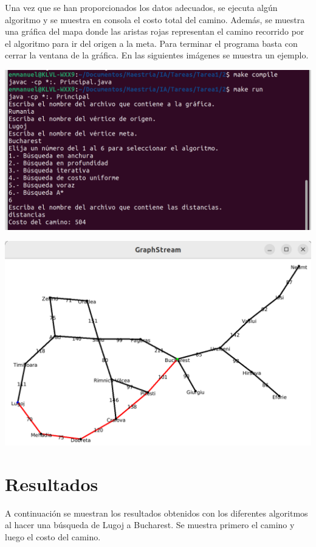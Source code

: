\documentclass{article}
\begin{document}
Una vez que se han proporcionados los datos adecuados, se ejecuta algún algoritmo y se muestra en consola el costo total del camino. Además, se muestra una gráfica del mapa donde las aristas rojas representan el camino recorrido por el algoritmo para ir del origen a la meta. Para terminar el programa basta con cerrar la ventana de la gráfica. En las siguientes imágenes se muestra un ejemplo.

\includegraphics[width=0.8\linewidth]{consola.png}

\includegraphics[width=0.8\linewidth]{grafica.png}

\section*{Resultados}

A continuación se muestran los resultados obtenidos con los diferentes algoritmos al hacer una búsqueda de Lugoj a Bucharest. Se muestra primero el camino y luego el costo del camino.
\end{document}
